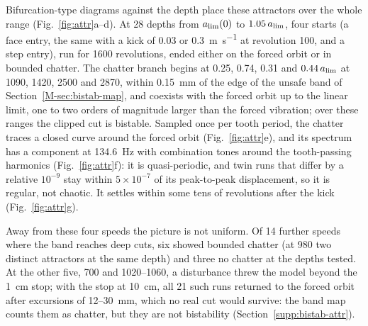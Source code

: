 Bifurcation-type diagrams against the depth place these attractors over the whole range (Fig.~\ref{fig:attr}a--d). At 28 depths from $a_{\lim}(0)$ to $1.05\,a_{\lim}$, four starts (a face entry, the same with a kick of 0.03 or \SI{0.3}{\metre\per\second} at revolution 100, and a step entry), run for 1600 revolutions, ended either on the forced orbit or in bounded chatter. The chatter branch begins at 0.25, 0.74, 0.31 and $0.44\,a_{\lim}$ at 1090, 1420, 2500 and \SI{2870}{\rpm}, within \SI{0.15}{\milli\metre} of the edge of the unsafe band of Section~\ref{M-sec:bistab-map}, and coexists with the forced orbit up to the linear limit, one to two orders of magnitude larger than the forced vibration; over these ranges the clipped cut is bistable. Sampled once per tooth period, the chatter traces a closed curve around the forced orbit (Fig.~\ref{fig:attr}e), and its spectrum has a component at \SI{134.6}{\hertz} with combination tones around the tooth-passing harmonics (Fig.~\ref{fig:attr}f): it is quasi-periodic, and twin runs that differ by a relative $10^{-9}$ stay within $5\times10^{-7}$ of its peak-to-peak displacement, so it is regular, not chaotic. It settles within some tens of revolutions after the kick (Fig.~\ref{fig:attr}g).

Away from these four speeds the picture is not uniform. Of 14 further speeds where the band reaches deep cuts, six showed bounded chatter (at \SI{980}{\rpm} two distinct attractors at the same depth) and three no chatter at the depths tested. At the other five, 700 and 1020--\SI{1060}{\rpm}, a disturbance threw the model beyond the \SI{1}{\centi\metre} stop; with the stop at \SI{10}{\centi\metre}, all 21 such runs returned to the forced orbit after excursions of 12--\SI{30}{\milli\metre}, which no real cut would survive: the band map counts them as chatter, but they are not bistability (Section~\ref{supp:bistab-attr}).

